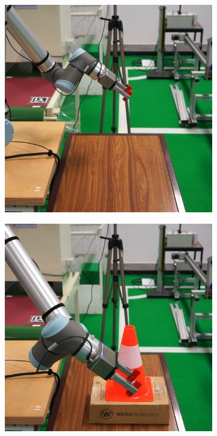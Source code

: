 \begin{figure}[h]
\begin{subfigure}{.2\linewidth}
    \end{subfigure}%
    \begin{subfigure}{.2\linewidth}
        \centering
        \includegraphics[width=.95\linewidth]{figs/chp6/col_real_no_5.jpg}
    \end{subfigure}
    \par\smallskip
    \begin{subfigure}{.2\linewidth}
        \centering
        \includegraphics[width=.95\linewidth]{figs/chp6/col_real_1.jpg}

\end{subfigure}
\end{figure}
